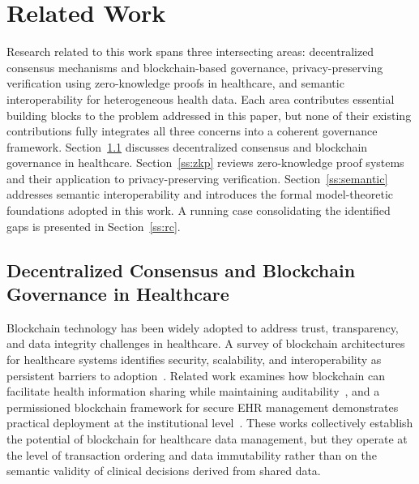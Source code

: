 \documentclass[journal]{IEEEtran}
\begin{document}
\section{Related Work}
\label{s:related-work}

Research related to this work spans three intersecting areas:
decentralized consensus mechanisms and blockchain-based governance,
privacy-preserving verification using zero-knowledge proofs in
healthcare, and semantic interoperability for heterogeneous health
data. Each area contributes essential building blocks to the problem
addressed in this paper, but none of their existing contributions
fully integrates all three concerns into a coherent governance
framework. Section~\ref{ss:consensus} discusses decentralized consensus
and blockchain governance in healthcare. Section~\ref{ss:zkp} reviews
zero-knowledge proof systems and their application to
privacy-preserving verification. Section~\ref{ss:semantic} addresses
semantic interoperability and introduces the formal model-theoretic
foundations adopted in this work. A running case consolidating the
identified gaps is presented in Section~\ref{ss:rc}.

\subsection{Decentralized Consensus and Blockchain Governance
in Healthcare}
\label{ss:consensus}

Blockchain technology has been widely adopted to address trust,
transparency, and data integrity challenges in healthcare.
A survey of blockchain architectures for healthcare systems
identifies security, scalability, and interoperability as persistent
barriers to adoption~\cite{Andrew2023}. Related work examines how
blockchain can facilitate health information sharing while maintaining
auditability~\cite{elvas2023sharing}, and a permissioned blockchain
framework for secure EHR management demonstrates practical deployment
at the institutional level~\cite{alruwaill2025hchain}. These works
collectively establish the potential of blockchain for healthcare data
management, but they operate at the level of transaction ordering and
data immutability rather than on the semantic validity of clinical
decisions derived from shared data.
\end{document}

